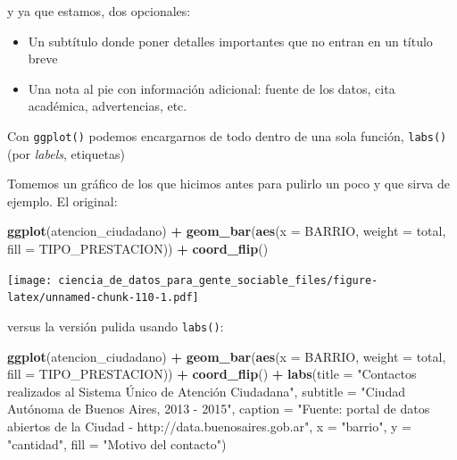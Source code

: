 \documentclass[spanish,]{book}
\newenvironment{Shaded}{\begin{snugshade}}{\end{snugshade}}
\newcommand{\DataTypeTok}[1]{\textcolor[rgb]{0.13,0.29,0.53}{#1}}
\newcommand{\KeywordTok}[1]{\textcolor[rgb]{0.13,0.29,0.53}{\textbf{#1}}}
\newcommand{\NormalTok}[1]{#1}
\newcommand{\OperatorTok}[1]{\textcolor[rgb]{0.81,0.36,0.00}{\textbf{#1}}}
\newcommand{\StringTok}[1]{\textcolor[rgb]{0.31,0.60,0.02}{#1}}
\providecommand{\tightlist}{%
  \setlength{\itemsep}{0pt}\setlength{\parskip}{0pt}}
\begin{document}
y ya que estamos, dos opcionales:

\begin{itemize}
\tightlist
\item
  Un subtítulo donde poner detalles importantes que no entran en un título breve
\item
  Una nota al pie con información adicional: fuente de los datos, cita académica, advertencias, etc.
\end{itemize}

Con \texttt{ggplot()} podemos encargarnos de todo dentro de una sola función, \texttt{labs()} (por \emph{labels}, etiquetas)

Tomemos un gráfico de los que hicimos antes para pulirlo un poco y que sirva de ejemplo. El original:

\begin{Shaded}
\begin{Highlighting}[]
\KeywordTok{ggplot}\NormalTok{(atencion_ciudadano) }\OperatorTok{+}
\StringTok{    }\KeywordTok{geom_bar}\NormalTok{(}\KeywordTok{aes}\NormalTok{(}\DataTypeTok{x =}\NormalTok{ BARRIO, }\DataTypeTok{weight =}\NormalTok{ total, }\DataTypeTok{fill =}\NormalTok{ TIPO_PRESTACION)) }\OperatorTok{+}
\StringTok{    }\KeywordTok{coord_flip}\NormalTok{()}
\end{Highlighting}
\end{Shaded}

\texttt{[image: ciencia\_de\_datos\_para\_gente\_sociable\_files/figure-latex/unnamed-chunk-110-1.pdf]}

versus la versión pulida usando \texttt{labs()}:

\begin{Shaded}
\begin{Highlighting}[]
\KeywordTok{ggplot}\NormalTok{(atencion_ciudadano) }\OperatorTok{+}
\StringTok{    }\KeywordTok{geom_bar}\NormalTok{(}\KeywordTok{aes}\NormalTok{(}\DataTypeTok{x =}\NormalTok{ BARRIO, }\DataTypeTok{weight =}\NormalTok{ total, }\DataTypeTok{fill =}\NormalTok{ TIPO_PRESTACION)) }\OperatorTok{+}
\StringTok{    }\KeywordTok{coord_flip}\NormalTok{() }\OperatorTok{+}
\StringTok{    }\KeywordTok{labs}\NormalTok{(}\DataTypeTok{title =} \StringTok{"Contactos realizados al Sistema Único de Atención Ciudadana"}\NormalTok{,}
         \DataTypeTok{subtitle =} \StringTok{"Ciudad Autónoma de Buenos Aires, 2013 - 2015"}\NormalTok{,}
         \DataTypeTok{caption =} \StringTok{"Fuente: portal de datos abiertos de la Ciudad - http://data.buenosaires.gob.ar"}\NormalTok{,}
         \DataTypeTok{x =} \StringTok{"barrio"}\NormalTok{,}
         \DataTypeTok{y =} \StringTok{"cantidad"}\NormalTok{,}
         \DataTypeTok{fill =} \StringTok{"Motivo del contacto"}\NormalTok{)}
\end{Highlighting}
\end{Shaded}
\end{document}
